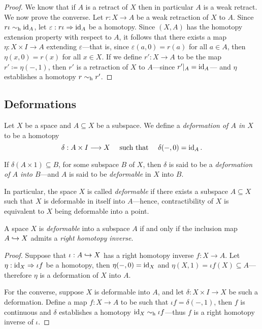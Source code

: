 \begin{proof}
    We know that if \(A\) is a retract of \(X\) then in particular \(A\) is a weak
    retract. We now prove the converse. Let \(r: X \to A\) be a weak retraction of
    \(X\) to \(A\). Since \(r \iota \sim_{\text{h}} \operatorname{id}_A\), let
    \(\varepsilon: r \iota \Rightarrow \operatorname{id}_A\) be a homotopy. Since \((X, A)\) has the
    homotopy extension property with respect to \(A\), it follows that there exists
    a map \(\eta: X \times I \to A\) extending \(\varepsilon\)---that is, since
    \(\varepsilon(a, 0) = r(a)\) for all \(a \in A\), then \(\eta(x, 0) = r(x)\) for
    all \(x \in X\). If we define \(r': X \to A\) to be the map
    \(r' \coloneq \eta(-, 1)\), then \(r'\) is a retraction of \(X\) to
    \(A\)---since \(r'|_A = \operatorname{id}_A\)--- and \(\eta\) establishes a homotopy
    \(r \sim_{\text{h}} r'\).
\end{proof}

\subsection{Deformations}

\begin{definition}[Deformation]
    \label{def:deformation}
    Let \(X\) be a space and \(A \subseteq X\) be a subspace. We define a
    \emph{deformation of \(A\) in \(X\)} to be a homotopy
    \[
        \delta: A \times I \longrightarrow X
        \quad\text{ such that }\quad
        \delta(-, 0) = \operatorname{id}_A.
    \]

    If \(\delta(A \times 1) \subseteq B\), for some subspace \(B\) of \(X\), then
    \(\delta\) is said to be a \emph{deformation of \(A\) into \(B\)}---and \(A\) is
    said to be \emph{deformable} in \(X\) into \(B\).

    In particular, the space \(X\) is called \emph{deformable} if there exists a
    subspace \(A \subseteq X\) such that \(X\) is deformable in itself into
    \(A\)---hence, contractibility of \(X\) is equivalent to \(X\) being deformable
    into a point.
\end{definition}

\begin{lemma}
    \label{lem:deformable-iff-right-inverse}
    A space \(X\) is \emph{deformable} into a subspace \(A\) if and only if the
    inclusion map \(A \hookrightarrow X\) admits a \emph{right homotopy inverse}.
\end{lemma}

\begin{proof}
    Suppose that \(\iota: A \hookrightarrow X\) has a right homotopy inverse \(f: X \to
    A\). Let \(\eta: \operatorname{id}_X \Rightarrow \iota f\) be a homotopy, then \(\eta(-, 0) =
    \operatorname{id}_X\) and \(\eta(X, 1) = \iota f(X) \subseteq A\)---therefore \(\eta\) is a
    deformation of \(X\) into \(A\).

    For the converse, suppose \(X\) is deformable into \(A\), and let \(\delta: X
    \times I \to X\) be such a deformation. Define a map \(f: X \to A\) to be such
    that \(\iota f = \delta(-, 1)\), then \(f\) is continuous and \(\delta\)
    establishes a homotopy \(\operatorname{id}_X \sim_{\text{h}} \iota f\)---thus \(f\) is a right homotopy
    inverse of \(\iota\).
\end{proof}

